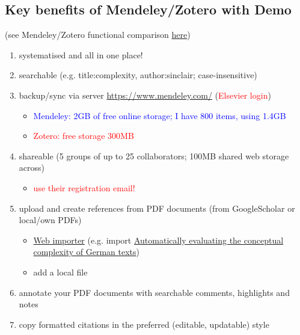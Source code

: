 \documentclass[a4paper,11pt]{article}
\begin{document}
\subsection{Key benefits of Mendeley/Zotero with Demo}
(see Mendeley/Zotero functional comparison \href{https://en.wikipedia.org/wiki/Comparison\_of\_reference\_management\_software}{here})
\begin{enumerate}
	\item systematised and all in one place!
	\item searchable (e.g. title:complexity, author:sinclair; case-insensitive)
	\item backup/sync via server \url{https://www.mendeley.com/} (\textcolor{red}{Elsevier login})
		\begin{itemize}
		\item \textcolor{blue}{Mendeley: 2GB of free online storage; I have 800 items, using 1.4GB}
		\item \textcolor{red}{Zotero: free storage 300MB}
		\end{itemize}
	\item shareable (5 groups of up to 25 collaborators; 100MB shared web storage across) %
	\begin{itemize}
		\item \textcolor{red}{use their registration email!}
	\end{itemize}
	\item upload and create references from PDF documents (from GoogleScholar or local/own PDFs)
		\begin{itemize}	
			\item \href{https://www.mendeley.com/reference-management/web-importer}{Web importer} (e.g. import \href{https://aclanthology.org/2021.konvens-1.23.pdf}{Automatically evaluating the conceptual complexity of German texts})
			\item add a local file
		\end{itemize}
	\item annotate your PDF documents with searchable comments, highlights and notes
	\item copy formatted citations in the preferred (editable, updatable) style 


\end{enumerate}
\end{document}
